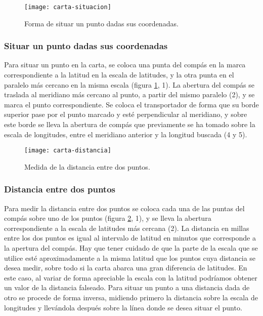 \begin{figure}[htbp]
\begin{center}
\texttt{[image: carta-situacion]}
\caption{Forma de situar un punto dadas sus coordenadas.}
\label{fg:carta-situacion}
\end{center}
\end{figure}

\subsubsection{Situar un punto dadas sus coordenadas}

Para situar un punto en la carta, se coloca una punta del compás en la marca 
correspondiente a la latitud en la escala de latitudes, y la otra punta en el paralelo 
más cercano en la misma escala (figura \ref{fg:carta-situacion}, 1). La abertura del compás se traslada 
al meridiano más cercano al punto, a partir del mismo paralelo (2), y se marca el 
punto correspondiente. Se coloca el transportador de forma que su borde superior 
pase por el punto marcado y esté perpendicular al meridiano, y sobre este borde 
se lleva la abertura de compás que previamente se ha tomado sobre la escala de longitudes,
entre el meridiano anterior y la longitud buscada (4 y 5).

\begin{figure}[htbp]
\begin{center}
\texttt{[image: carta-distancia]}
\caption{Medida de la distancia entre dos puntos.}
\label{fg:carta-distancia}
\end{center}
\end{figure}


\subsubsection{Distancia entre dos puntos}

Para medir la distancia entre dos puntos se coloca cada una de las puntas del compás 
sobre uno de los puntos (figura \ref{fg:carta-distancia}, 1), y se lleva 
la abertura correspondiente a la escala 
de latitudes más cercana (2). La distancia en millas entre los dos puntos es igual al 
intervalo de latitud en minutos que corresponde a la apertura del compás. 
Hay que tener cuidado de que la parte de la escala que se utilice esté aproximadamente 
a la misma latitud que los puntos cuya distancia se desea medir, sobre todo si la 
carta abarca una gran diferencia de latitudes. En este caso, al variar de forma apreciable la 
escala con la latitud podríamos obtener un valor de la distancia falseado. 
Para situar un punto a una distancia dada de otro se procede de forma inversa, 
midiendo primero la distancia sobre la escala de longitudes y llevándola después sobre la 
línea donde se desea situar el punto. 

